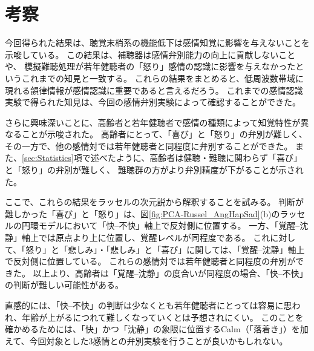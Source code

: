 


\section{考察}
今回得られた結果は、聴覚末梢系の機能低下は感情知覚に影響を与えないことを示唆している。
この結果は、補聴器は感情弁別能力の向上に貢献しないこと\cite{goy2018hearing} や、
模擬難聴処理が若年健聴者の「怒り」感情の認識に影響を与えなかった\cite{morgan2022perceived}というこれまでの知見と一致する。
これらの結果をまとめると、低周波数帯域に現れる韻律情報が感情認識に重要であると言えるだろう\cite{orbelo2005impaired,ben2019age}。
これまでの感情認識実験で得られた知見は、今回の感情弁別実験によって確認することができた。

さらに興味深いことに、高齢者と若年健聴者で感情の種類によって知覚特性が異なることが示唆された。
高齢者にとって、「喜び」と「怒り」の弁別が難しく、その一方で、他の感情対では若年健聴者と同程度に弁別することができた。
また、\ref{sec:Statistics}項で述べたように、高齢者は健聴・難聴に関わらず「喜び」と「怒り」の弁別が難しく、
難聴群の方がより弁別精度が下がることが示された。

ここで、これらの結果をラッセルの次元説\cite{russell1980circumplex}から解釈することを試みる。
判断が難しかった「喜び」と「怒り」は、図\ref{fig:PCA-Russel_AngHapSad}(b)のラッセルの円環モデルにおいて「快--不快」軸上で反対側に位置する。
一方、「覚醒--沈静」軸上では原点より上に位置し、覚醒レベルが同程度である。
これに対して、「怒り」と「悲しみ」・「悲しみ」と「喜び」に関しては、「覚醒--沈静」軸上で反対側に位置している。
これらの感情対では若年健聴者と同程度の弁別ができた。
以上より、高齢者は「覚醒--沈静」の度合いが同程度の場合、「快--不快」の判断が難しい可能性がある。

直感的には、「快--不快」の判断は少なくとも若年健聴者にとっては容易に思われ、年齢が上がるにつれて難しくなっていくとは予想されにくい。
このことを確かめるためには、「快」かつ「沈静」の象限に位置するCalm（「落着き」）を加えて、今回対象とした3感情との弁別実験を行うことが良いかもしれない。



